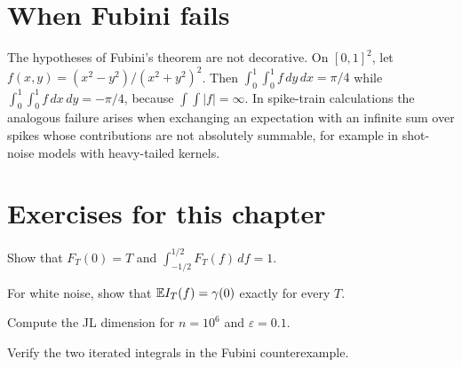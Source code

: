\section{When Fubini fails}
The hypotheses of Fubini's theorem are not decorative. On
$[0,1]^2$, let $f(x,y)=(x^2-y^2)/(x^2+y^2)^2$. Then
$\int_0^1\int_0^1f\,dy\,dx=\pi/4$ while
$\int_0^1\int_0^1f\,dx\,dy=-\pi/4$, because $\int\!\!\int|f|=\infty$. In
spike-train calculations the analogous failure arises when exchanging
an expectation with an infinite sum over spikes whose contributions are
not absolutely summable, for example in shot-noise models with heavy-tailed
kernels.

\section*{Exercises for this chapter}
\begin{exercise}
Show that $F_T(0)=T$ and $\int_{-1/2}^{1/2}F_T(f)\,df=1$.
\end{exercise}
\begin{exercise}
For white noise, show that $\mathbb{E} I_T(f)=\gamma(0)$ exactly for every $T$.
\end{exercise}
\begin{exercise}
Compute the JL dimension for $n=10^6$ and $\varepsilon=0.1$.
\end{exercise}
\begin{exercise}
Verify the two iterated integrals in the Fubini counterexample.
\end{exercise}

